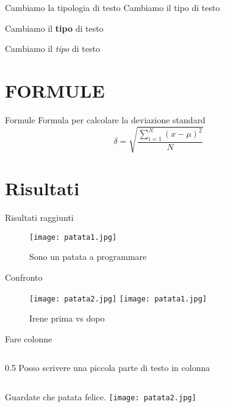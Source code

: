 \documentclass{beamer} %
\begin{document}
\begin{frame}{Cambiamo la tipologia di testo}
    Cambiamo il tipo di testo 
    \bigskip %
    
    Cambiamo il \textbf{tipo} di testo %
    \bigskip
    
    Cambiamo il \textit{tipo} di testo %
\end{frame}

\section{FORMULE} %

\begin{frame}{Formule }
Formula per calcolare la deviazione standard
\bigskip
    \begin{equation}
        \delta = \sqrt{\frac{\displaystyle\sum_{i=1}^{N}{(x - \mu)^2}}{N}}
    \end{equation}
\end{frame}

\section{Risultati}

\begin{frame}{Risultati raggiunti}
   \begin{figure}
       \centering
       \texttt{[image: patata1.jpg]}
       \caption{Sono un patata a programmare}
       \label{fig:patata1}
   \end{figure}
\end{frame}

\begin{frame}{Confronto}
    \begin{figure}
        \centering
        \texttt{[image: patata2.jpg]}
        \texttt{[image: patata1.jpg]}
        \caption{Irene prima vs dopo}
        \label{confronto}
    \end{figure}
\end{frame}

\begin{frame}{Fare colonne}
\begin{column} {0.5\textwidth}
    Posso scrivere una piccola parte di testo in colonna
\end{column}

\bigskip

        \begin{column}{0.5\textwidth}
        Guardate che patata felice. 
        \texttt{[image: patata2.jpg]} %
        \end{column}

\end{frame}
\end{document}
